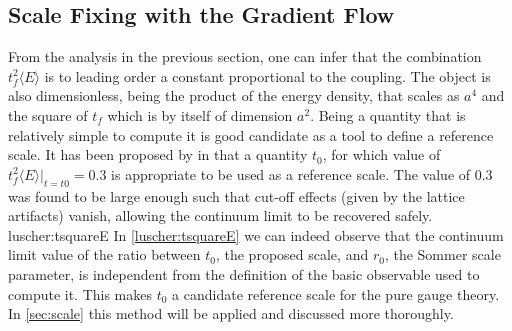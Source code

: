 \subsection{Scale Fixing with the Gradient Flow}
\label{sec:scale_fixing}
From the analysis in the previous section, one can infer that the combination $t_f^2\langle E\rangle$ is to leading order a constant proportional to the coupling. The object is also dimensionless, being the product of the energy density, that scales as $a^4$ and the square of $t_f$ which is by itself of dimension $a^2$. Being a quantity that is relatively simple to compute it is  good candidate as a tool to define a reference scale. 
It has been proposed by in \cite{luscher_properties_2010} that a quantity $t_0$, for which value of $t_f^2\langle E\rangle \vert_{t=t0}= 0.3$ is appropriate to be used as a reference scale. The value of $0.3$ was found to be large enough such that cut-off effects (given by the lattice artifacts) vanish, allowing the continuum limit to be recovered safely. 
 {luscher:tsquareE}
In \cref{luscher:tsquareE} we can indeed observe that the continuum limit value of the ratio between $t_0$, the proposed scale, and $r_0$, the Sommer scale parameter, is independent from the definition of the basic observable used to compute it. This makes $t_0$ a candidate reference scale for the pure gauge theory.\\
In \cref{sec:scale} this method will be applied and discussed more thoroughly.
 
